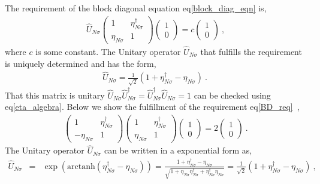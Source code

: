 \documentclass[12pt,a4paper]{article}
\begin{document}
The requirement of the block diagonal equation eq\eqref{block_diag_eqn} is,
\begin{eqnarray}
\hat{U}_{N\sigma}\begin{pmatrix}
											1 & \eta^{\dagger}_{N\sigma}\\
											\eta_{N\sigma} & 1
											\end{pmatrix}\begin{pmatrix}
											1 \\ 0
											\end{pmatrix} = c\begin{pmatrix}
											1 \\ 0
											\end{pmatrix}~,\label{BD_req}
\end{eqnarray}
where $c$ is some constant.
The Unitary operator $\hat{U}_{N\sigma}$ that fulfills the requirement is uniquely determined and has the form,
\begin{eqnarray}
\hat{U}_{N\sigma} = \frac{1}{\sqrt{2}}(1+\eta^{\dagger}_{N\sigma}-\eta_{N\sigma})~.~
\end{eqnarray}
That this matrix is unitary $\hat{U}_{N\sigma}\hat{U}^{\dagger}_{N\sigma}= \hat{U}^{\dagger}_{N\sigma}\hat{U}_{N\sigma} =1$ can be checked using eq\eqref{eta_algebra}.
Below we show the fulfillment of the requirement eq\eqref{BD_req}~,
\begin{eqnarray}
\begin{pmatrix}
1 & \eta^{\dagger}_{N\sigma} \\
-\eta_{N\sigma} & 1
\end{pmatrix}\begin{pmatrix}
1 & \eta^{\dagger}_{N\sigma} \\
\eta_{N\sigma} & 1
\end{pmatrix}\begin{pmatrix}
1 \\ 0
\end{pmatrix}=2\begin{pmatrix}
1 \\ 0
\end{pmatrix}~.
\end{eqnarray}
The Unitary operator $\hat{U}_{N\sigma}$ can be written in a exponential form as,
\begin{eqnarray}
\hat{U}_{N\sigma} &=&\exp(\text{arctanh}(\eta^{\dagger}_{N\sigma}-\eta_{N\sigma}))= \frac{1+\eta^{\dagger}_{N\sigma}-\eta_{N\sigma}}{\sqrt{1+\eta_{N\sigma}\eta^{\dagger}_{N\sigma}+\eta^{\dagger}_{N\sigma}\eta_{N\sigma}}}=\frac{1}{\sqrt{2}}(1+\eta^{\dagger}_{N\sigma}-\eta_{N\sigma})~,\nonumber\label{unitary_matrix}
\end{eqnarray}
\end{document}
